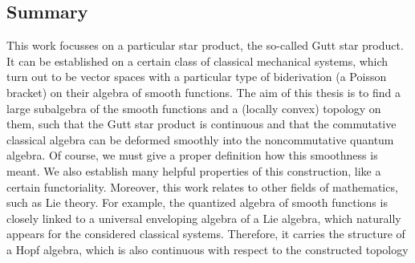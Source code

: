 \subsection*{Summary}

This work focusses on a particular star product, the so-called Gutt star 
product. It can be established on a certain class of classical mechanical systems, 
which turn out to be vector spaces with a particular type of biderivation (a 
Poisson bracket) on their algebra of smooth functions. The aim of this thesis
is to find a large subalgebra of the smooth functions and a (locally 
convex) topology on them, such that the Gutt star product is continuous and that 
the commutative classical algebra can be deformed smoothly into the 
noncommutative quantum algebra. Of course, we must give a proper definition 
how this smoothness is meant. We also establish many helpful
properties of this construction, like a certain functoriality. Moreover, this work 
relates to other fields of mathematics, such as Lie theory. For example, the 
quantized algebra of smooth functions is closely linked to a universal enveloping 
algebra of a Lie algebra, which naturally appears for the considered classical 
systems. Therefore, it carries the structure of a Hopf algebra, which is also 
continuous with respect to the constructed topology


